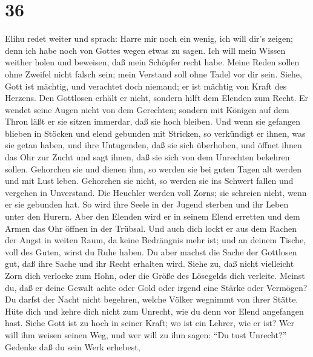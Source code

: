 \hypertarget{section-35}{%
\section{36}\label{section-35}}

 Elihu redet weiter und sprach:  Harre mir noch
ein wenig, ich will dir's zeigen; denn ich habe noch von Gottes wegen
etwas zu sagen.  Ich will mein Wissen weither holen und
beweisen, daß mein Schöpfer recht habe.  Meine Reden sollen
ohne Zweifel nicht falsch sein; mein Verstand soll ohne Tadel vor dir
sein.  Siehe, Gott ist mächtig, und verachtet doch niemand;
er ist mächtig von Kraft des Herzens.  Den Gottlosen erhält
er nicht, sondern hilft dem Elenden zum Recht.  Er wendet
seine Augen nicht von dem Gerechten; sondern mit Königen auf dem Thron
läßt er sie sitzen immerdar, daß sie hoch bleiben.  Und wenn
sie gefangen blieben in Stöcken und elend gebunden mit Stricken,
 so verkündigt er ihnen, was sie getan haben, und ihre
Untugenden, daß sie sich überhoben,  und öffnet ihnen das
Ohr zur Zucht und sagt ihnen, daß sie sich von dem Unrechten bekehren
sollen.  Gehorchen sie und dienen ihm, so werden sie bei
guten Tagen alt werden und mit Lust leben.  Gehorchen sie
nicht, so werden sie ins Schwert fallen und vergehen in Unverstand.
 Die Heuchler werden voll Zorns; sie schreien nicht, wenn
er sie gebunden hat.  So wird ihre Seele in der Jugend
sterben und ihr Leben unter den Hurern.  Aber den Elenden
wird er in seinem Elend erretten und dem Armen das Ohr öffnen in der
Trübsal.  Und auch dich lockt er aus dem Rachen der Angst
in weiten Raum, da keine Bedrängnis mehr ist; und an deinem Tische, voll
des Guten, wirst du Ruhe haben.  Du aber machst die Sache
der Gottlosen gut, daß ihre Sache und ihr Recht erhalten wird.
 Siehe zu, daß nicht vielleicht Zorn dich verlocke zum
Hohn, oder die Größe des Lösegelds dich verleite.  Meinst
du, daß er deine Gewalt achte oder Gold oder irgend eine Stärke oder
Vermögen?  Du darfst der Nacht nicht begehren, welche
Völker wegnimmt von ihrer Stätte.  Hüte dich und kehre dich
nicht zum Unrecht, wie du denn vor Elend angefangen hast. 
Siehe Gott ist zu hoch in seiner Kraft; wo ist ein Lehrer, wie er ist?
 Wer will ihm weisen seinen Weg, und wer will zu ihm sagen:
``Du tust Unrecht?''  Gedenke daß du sein Werk erhebest,
